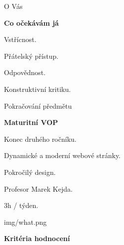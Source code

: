 \documentclass[aspectratio=1610]{beamer}
\begin{document}
\begin{frame}{O Vás}
    \begin{cardTiny}
        \textbf{Co očekávám já}
    
        \begin{flushleft}
        Vstřícnost.

        Přátelský přístup.

        Odpovědnost.

        Konstruktivní kritiku.
        \end{flushleft}
    \end{cardTiny}
\end{frame}

\begin{frame}{Pokračování předmětu}
    \begin{cardTiny}
        \textbf{Maturitní VOP}

        Konec druhého ročníku.

        Dynamické a moderní webové stránky.

        Pokročilý design.

        Profesor Marek Kejda.

        3h / týden.
    \end{cardTiny}
\end{frame}

\begin{frameImg}[width]{img/what.png}
    \vspace*{60mm}
    \begin{cardTiny}
        \vspace*{\fill}
        \begin{center}
            \textbf{Kritéria hodnocení}
        \end{center}
    \end{cardTiny}
\end{frameImg}
\end{document}
